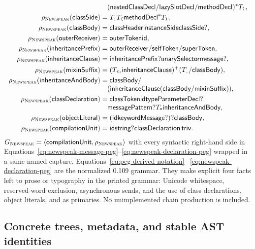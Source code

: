 \begin{equation}
\begin{aligned}
 &\quad(\mathsf{nestedClassDecl}/\mathsf{lazySlotDecl}/
      \mathsf{methodDecl})^*T_{\texttt{)}},\\
 \rho_{\textsc{Newspeak}}(\mathsf{classSide})&=T_{\texttt{:}}T_{\texttt{(}}
      \mathsf{methodDecl}^*T_{\texttt{)}},\\
 \rho_{\textsc{Newspeak}}(\mathsf{classBody})&=\mathsf{classHeader}
      \mathsf{instanceSide}\mathsf{classSide}?,\\
 \rho_{\textsc{Newspeak}}(\mathsf{outerReceiver})&=\mathsf{outerToken}\mathsf{id},\\
 \rho_{\textsc{Newspeak}}(\mathsf{inheritancePrefix})&=\mathsf{outerReceiver}/
      \mathsf{selfToken}/\mathsf{superToken},\\
 \rho_{\textsc{Newspeak}}(\mathsf{inheritanceClause})&=\mathsf{inheritancePrefix}?
      \mathsf{unarySelector}\mathsf{message}?,\\
 \rho_{\textsc{Newspeak}}(\mathsf{mixinSuffix})&=
      (T_{\texttt{<:}}\mathsf{inheritanceClause})^+
      (T_{\texttt{.}}/\mathsf{classBody}),\\
 \rho_{\textsc{Newspeak}}(\mathsf{inheritanceAndBody})&=\mathsf{classBody}/\\[-1mm]
 &\quad(\mathsf{inheritanceClause}
        (\mathsf{classBody}/\mathsf{mixinSuffix})),\\
 \rho_{\textsc{Newspeak}}(\mathsf{classDeclaration})&=\mathsf{classToken}\mathsf{id}
      \mathsf{typeParameterDecl}?\\[-1mm]
 &\quad\mathsf{messagePattern}?T_{\texttt{=}}
      \mathsf{inheritanceAndBody},\\
 \rho_{\textsc{Newspeak}}(\mathsf{objectLiteral})&=
      (\mathsf{id}\mathsf{keywordMessage}?)?\mathsf{classBody},\\
 \rho_{\textsc{Newspeak}}(\mathsf{compilationUnit})&=\mathsf{id}\mathsf{string}?
      \mathsf{classDeclaration}\,\mathsf{triv}.
\end{aligned}
\end{equation}
$G_{\textsc{Newspeak}}=\langle\mathsf{compilationUnit},\rho_{\textsc{Newspeak}}\rangle$ with every
syntactic right-hand side in
Equations~\eqref{eq:newspeak-message-peg}--\eqref{eq:newspeak-declaration-peg}
wrapped in a same-named capture.  Equations~\eqref{eq:peg-derived-notation}--
\eqref{eq:newspeak-declaration-peg} are the normalized 0.109 grammar.  They
make explicit four facts left to prose or typography in the printed grammar:
Unicode whitespace, reserved-word exclusion, asynchronous sends, and the use
of class declarations, object literals, and  as primaries.  No
unimplemented chain production is included.

\subsection{Concrete trees, metadata, and stable AST identities}
\label{sec:ast-construction}

